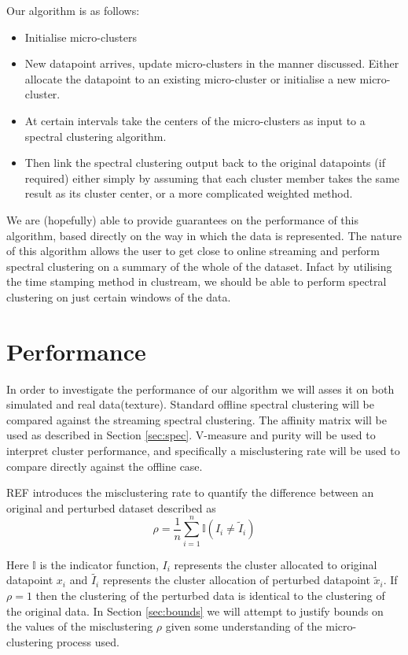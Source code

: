 \documentclass[a4document]{article}		%
\begin{document}
Our algorithm is as follows: 
\begin{itemize}
\item  Initialise micro-clusters
\item New datapoint arrives, update micro-clusters in the manner discussed. Either allocate the datapoint to an existing micro-cluster or initialise a new micro-cluster. 
\item At certain intervals take the centers of the micro-clusters as input to a spectral clustering algorithm. 
\item Then link the spectral clustering output back to the original datapoints (if required) either simply by assuming that each cluster member takes the same result as its cluster center, or a more complicated weighted method. 
\end{itemize}

We are (hopefully) able to provide guarantees on the performance of this algorithm, based directly on the way in which the data is represented. The nature of this algorithm allows the user to get close to online streaming and perform spectral clustering on a summary of the whole of the dataset. Infact by utilising the time stamping method in clustream, we should be able to perform spectral clustering on just certain windows of the data. 

\section{Performance}
\label{sec:perf}

In order to investigate the performance of our algorithm we will asses it on both simulated and real data(texture). Standard offline spectral clustering will be compared against the streaming spectral clustering. The affinity matrix will be used as described in Section \ref{sec:spec}. V-measure and purity will be used to interpret cluster performance, and specifically a misclustering rate will be used to compare directly against the offline case.  

REF introduces the misclustering rate to quantify the difference between an original and perturbed dataset described as 
\begin{equation}
  \label{eq:misClust}
  \rho = \frac{1}{n} \sum_{i = 1}^{n} \mathbb{I}(I_i \neq \tilde{I}_i)
\end{equation}

Here $\mathbb{I}$ is the indicator function, $I_i$ represents the cluster allocated to original datapoint $x_i$ and $\tilde{I_i}$ represents the cluster allocation of perturbed datapoint $\tilde{x}_i$. If $\rho = 1$ then the clustering of the perturbed data is identical to the clustering of the original data. In Section \ref{sec:bounds} we will attempt to justify bounds on the values of the misclustering $\rho$ given some understanding of the micro-clustering process used. 
 
\end{document}
